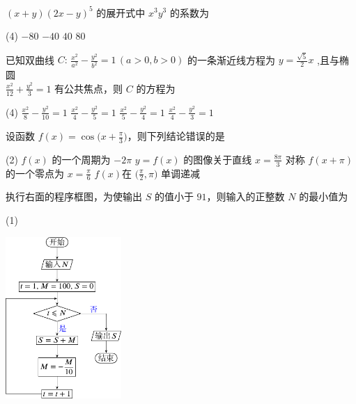 \documentclass[12pt,twoside,space]{ctexart}
\begin{document}
\begin{enumerate}[itemsep=0.2em,topsep=0pt]
\item $(x+y)(2x-y)^5$ 的展开式中 $x^3y^3$ 的系数为 
\begin{tasks}(4)
	\task $-80$ \task $-40$ \task $40$ \task $80$ 
\end{tasks}
\item 已知双曲线 $C\colon\,\tfrac{x^2}{a^2}-\tfrac{y^2}{b^2}=1\,(a>0,b>0)$ 的一条渐近线方程为 $y=\tfrac{\sqrt{5}}{2}x$ ,且与椭圆\\
 $\tfrac{x^2}{12}+\tfrac{y^2}{3}=1$ 有公共焦点，则 $C$ 的方程为
\begin{tasks}(4)
	\task $\frac{x^2}{8}-\frac{y^2}{10}=1$ \task $\frac{x^2}{4}-\frac{y^2}{5}=1$ \task $\frac{x^2}{5}-\frac{y^2}{4}=1$ \task $\frac{x^2}{4}-\frac{y^2}{3}=1$ 
\end{tasks}
\item 设函数 $f(x)=\cos\big(x+\tfrac{\pi}{3}\big)$，则下列结论错误的是
\begin{tasks}(2)
\task $f(x)$ 的一个周期为 $-2\pi$ \task $y=f(x)$ 的图像关于直线 $x=\frac{8\pi}{3}$ 对称
\task $f(x+\pi)$ 的一个零点为 $x=\frac{\pi}{6}$ \task  $f(x)$在 $\Big(\frac{\pi}{2},\pi\Big)$ 单调递减 
\end{tasks}
\begin{minipage}[h][20ex][t]{.5\textwidth}\item 执行右面的程序框图，为使输出 $S$ 的值小于 $91$，则输入的正整数 $N$ 的最小值为
\begin{tasks}(1)
	    
\end{tasks}\end{minipage}
\begin{minipage}[h][20ex][t]{.45\textwidth}
\includegraphics[width=4.4cm]{liuchengtu.pdf}
\end{minipage}\vspace{8em}


\end{enumerate}
\end{document}
